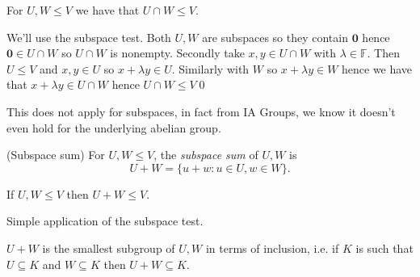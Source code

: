 \documentclass{article}
\newcommand{\F}{\mathbb{F}}
\begin{document}
\begin{lemma}
  For $ U,W\le V $ we have that $ U\cap W\le V $.
\end{lemma}
\pf We'll use the subspace test. Both $ U,W $ are subspaces so they contain $ \boldsymbol 0 $ hence $ \boldsymbol 0\in U\cap W $ so $ U\cap W $ is nonempty. Secondly take $ x,y\in U\cap W $ with $ \lambda \in \F $. Then $ U\le V $ and $ x,y\in U $ so $ x+\lambda y\in U $. Similarly with $ W $ so $ x+\lambda y \in W $ hence we have that $ x+\lambda y \in U \cap W $ hence $ U\cap W\le V $\qed
\begin{remark}
  This does not apply for subspaces, in fact from IA Groups, we know it doesn't even hold for the underlying abelian group.
\end{remark}
\begin{definition}
	(Subspace sum) For $ U,W\le V $, the \textit{subspace sum} of $ U, W $ is
	\[
		U+W=\{u+w:u\in U, w\in W\}.
	\]
\end{definition}
\begin{lemma}
  If $ U, W\le V $ then $ U+W\le V $.
\end{lemma}
\pf Simple application of the subspace test.
\begin{remark}
  $ U+W $ is the smallest subgroup of $ U, W $ in terms of inclusion, i.e. if $ K $ is such that $ U\subseteq K $ and $ W\subseteq K $ then $ U+W\subseteq K $.
\end{remark}
\end{document}
